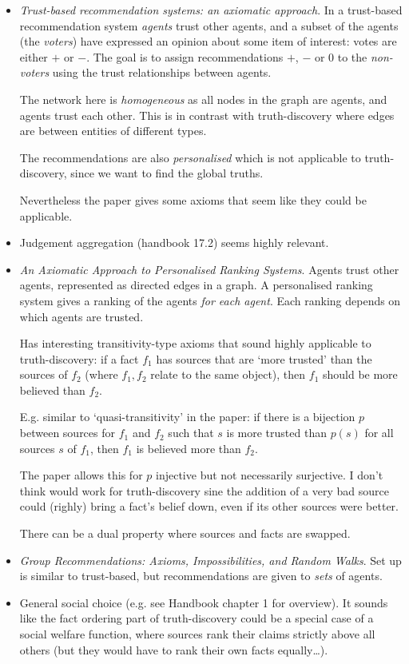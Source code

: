 \documentclass{article}
\theoremstyle{definition} \newtheorem{definition}{Definition}
\theoremstyle{definition} \newtheorem{example}{Example}
\theoremstyle{plain} \newtheorem{axiom}{Axiom}
\theoremstyle{plain} \newtheorem*{remark}{Remark}
\theoremstyle{remark} \newtheorem*{notation}{Notation}
\theoremstyle{plain} \newtheorem{lemma}{Lemma}
\theoremstyle{plain} \newtheorem{proposition}{Proposition}
\begin{document}
\begin{itemize}

\item \emph{Trust-based recommendation systems: an axiomatic
approach}{\cite{andersen}}. In a trust-based recommendation system
\emph{agents} trust other agents, and a subset of the agents (the
\emph{voters}) have expressed an opinion about some item of interest: votes are
either $+$ or $-$. The goal is to assign recommendations $+$, $-$ or $0$ to the
\emph{non-voters} using the trust relationships between agents.

The network here is \emph{homogeneous} as all nodes in the graph are agents,
and agents trust each other. This is in contrast with truth-discovery where
edges are between entities of different types.

The recommendations are also \emph{personalised} which is not applicable to
truth-discovery, since we want to find the global truths.

Nevertheless the paper gives some axioms that seem like they could be
applicable.

\item Judgement aggregation (handbook 17.2) seems highly relevant.

\item \emph{An Axiomatic Approach to Personalised Ranking
Systems}{\cite{altman_personalised}}. Agents trust other agents, represented as
directed edges in a graph. A personalised ranking system gives a ranking of the
agents \emph{for each agent}. Each ranking depends on which agents are trusted.

Has interesting transitivity-type axioms that sound highly applicable to
truth-discovery: if a fact $f_1$ has sources that are `more trusted' than the
sources of $f_2$ (where $f_1, f_2$ relate to the same object), then $f_1$
should be more believed than $f_2$.

E.g. similar to `quasi-transitivity' in the paper: if there is a bijection $p$
between sources for $f_1$ and $f_2$ such that $s$ is more trusted than $p(s)$
for all sources $s$ of $f_1$, then $f_1$ is believed more than $f_2$.

The paper allows this for $p$ injective but not necessarily surjective. I don't
think would work for truth-discovery sine the addition of a very bad source
could (righly) bring a fact's belief down, even if its other sources were
better.

There can be a dual property where sources and facts are swapped.

\item \emph{Group Recommendations: Axioms, Impossibilities, and Random
Walks}{\cite{lev}}. Set up is similar to trust-based, but recommendations are
given to \emph{sets} of agents.

\item General social choice (e.g. see Handbook chapter 1 for overview). It
sounds like the fact ordering part of truth-discovery could be a special case
of a social welfare function, where sources rank their claims strictly above
all others (but they would have to rank their own facts equally\ldots).

\end{itemize}
\end{document}
